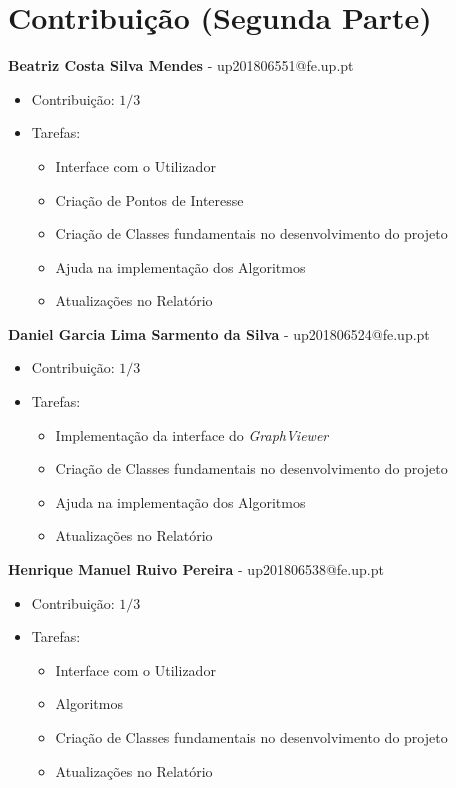 \documentclass[article, a4paper, 12pt, oneside]{memoir}
\begin{document}
\chapter[Contribuição (Segunda Parte)][Contribuição (Segunda Parte)]{Contribuição (Segunda Parte)} \label{\thechapter}

\textbf{Beatriz Costa Silva Mendes} - up201806551@fe.up.pt

\begin{itemize}
\item Contribuição: $1/3$
\item Tarefas:
	\begin{itemize}
	\item Interface com o Utilizador
	\item Criação de Pontos de Interesse
	\item Criação de Classes fundamentais no desenvolvimento do projeto
	\item Ajuda na implementação dos Algoritmos
	\item Atualizações no Relatório	
	\end{itemize}
\end{itemize}


\textbf{Daniel Garcia Lima Sarmento da Silva} - up201806524@fe.up.pt

\begin{itemize}
\item Contribuição: $1/3$
\item Tarefas:
	\begin{itemize}
	\item Implementação da interface do \textit{GraphViewer}
	\item Criação de Classes fundamentais no desenvolvimento do projeto
	\item Ajuda na implementação dos Algoritmos
	\item Atualizações no Relatório
	\end{itemize}
\end{itemize}


\textbf{Henrique Manuel Ruivo Pereira} - up201806538@fe.up.pt

\begin{itemize}
\item Contribuição: $1/3$
\item Tarefas:
	\begin{itemize}
	\item Interface com o Utilizador
	\item Algoritmos
	\item Criação de Classes fundamentais no desenvolvimento do projeto
	\item Atualizações no Relatório
	\end{itemize}
\end{itemize}
\end{document}
